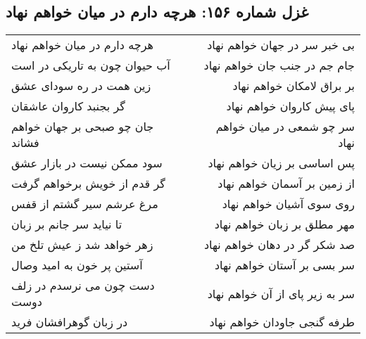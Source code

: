 \begin{center}
\section*{غزل شماره ۱۵۶: هرچه دارم در میان خواهم نهاد}
\label{sec:156}
\begin{longtable}{l p{0.5cm} r}
هرچه دارم در میان خواهم نهاد
&&
بی خبر سر در جهان خواهم نهاد
\\
آب حیوان چون به تاریکی در است
&&
جام جم در جنب جان خواهم نهاد
\\
زین همت در ره سودای عشق
&&
بر براق لامکان خواهم نهاد
\\
گر بجنبد کاروان عاشقان
&&
پای پیش کاروان خواهم نهاد
\\
جان چو صبحی بر جهان خواهم فشاند
&&
سر چو شمعی در میان خواهم نهاد
\\
سود ممکن نیست در بازار عشق
&&
پس اساسی بر زیان خواهم نهاد
\\
گر قدم از خویش برخواهم گرفت
&&
از زمین بر آسمان خواهم نهاد
\\
مرغ عرشم سیر گشتم از قفس
&&
روی سوی آشیان خواهم نهاد
\\
تا نیاید سر جانم بر زبان
&&
مهر مطلق بر زبان خواهم نهاد
\\
زهر خواهد شد ز عیش تلخ من
&&
صد شکر گر در دهان خواهم نهاد
\\
آستین پر خون به امید وصال
&&
سر بسی بر آستان خواهم نهاد
\\
دست چون می نرسدم در زلف دوست
&&
سر به زیر پای از آن خواهم نهاد
\\
در زبان گوهرافشان فرید
&&
طرفه گنجی جاودان خواهم نهاد
\\
\end{longtable}
\end{center}
